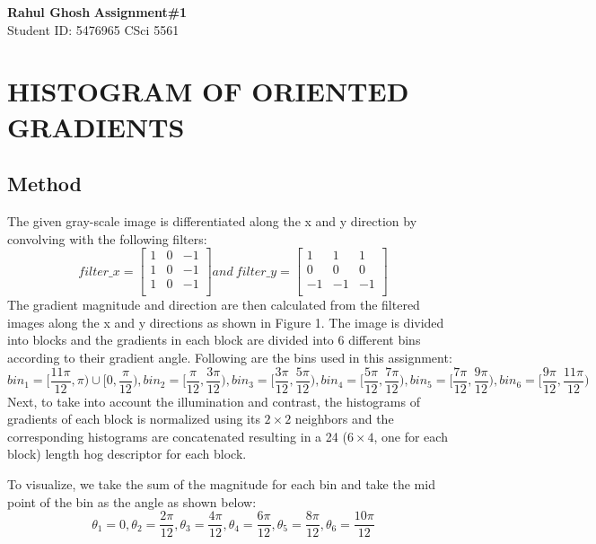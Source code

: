 \documentclass[letter, 10pt]{article}
\begin{document}
\noindent
\large \textbf{Rahul Ghosh} \hfill \textbf{Assignment\#1}\\
\normalsize Student ID: 5476965 \hfill CSci 5561\\

\section*{HISTOGRAM OF ORIENTED GRADIENTS}
\subsection*{Method}
The given gray-scale image is differentiated along the x and y direction by convolving with the following filters:
\begin{equation*}
    filter\_x = \begin{bmatrix}
    1 & 0 & -1\\
    1 & 0 & -1\\
    1 & 0 & -1\\
    \end{bmatrix}
    and\ filter\_y = \begin{bmatrix}
    1 & 1 & 1\\
    0 & 0 & 0\\
    -1 & -1 & -1\\
    \end{bmatrix}
\end{equation*}
The gradient magnitude and direction are then calculated from the filtered images along the x and y directions as shown in Figure 1. The image is divided into blocks and the gradients in each block are divided into 6 different bins according to their gradient angle. Following are the bins used in this assignment:
\begin{equation*}
    bin_1 = [\frac{11\pi}{12}, \pi)\cup[0, \frac{\pi}{12}),
    bin_2 = [\frac{\pi}{12}, \frac{3\pi}{12}),
    bin_3 = [\frac{3\pi}{12}, \frac{5\pi}{12}),
    bin_4 = [\frac{5\pi}{12}, \frac{7\pi}{12}),
    bin_5 = [\frac{7\pi}{12}, \frac{9\pi}{12}),
    bin_6 = [\frac{9\pi}{12}, \frac{11\pi}{12})
\end{equation*}
Next, to take into account the illumination and contrast, the histograms of gradients of each block is normalized using its $2\times2$ neighbors and the corresponding histograms are concatenated resulting in a 24 ($6\times4$, one for each block) length hog descriptor for each block.

To visualize, we take the sum of the magnitude for each bin and take the mid point of the bin as the angle as shown below:
\begin{equation*}
    \theta_1 = 0, \theta_2 = \frac{2\pi}{12}, \theta_3 = \frac{4\pi}{12}, \theta_4 = \frac{6\pi}{12}, \theta_5 = \frac{8\pi}{12}, \theta_6 = \frac{10\pi}{12}
\end{equation*}
\end{document}
